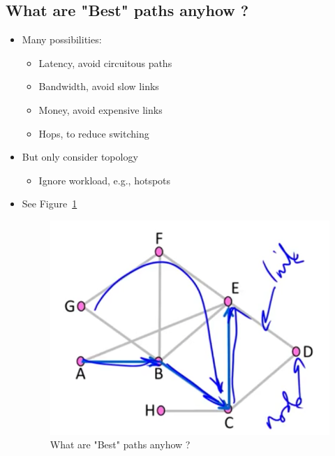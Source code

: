 \documentclass[12pt]{ctexart}   %
\begin{document}
	\subsection{What are "Best" paths anyhow ?}
	\begin{itemize}
		\item Many possibilities:
		\begin{itemize}
			\item Latency, avoid circuitous paths
			\item Bandwidth, avoid slow links
			\item Money, avoid expensive links
			\item Hops, to reduce switching
		\end{itemize}
		
		\item But only consider topology
		\begin{itemize}
			\item Ignore workload, e.g., hotspots
		\end{itemize}
		\item See Figure~\ref{fig:5-2-2}
			
		\begin{figure}[h!] %
		\centering
		 \includegraphics[scale=0.7]{images/5-2-2}
		\caption{ What are "Best" paths anyhow ? }
		 \label{fig:5-2-2}
		 \end{figure}
	\end{itemize}
	
\end{document}
